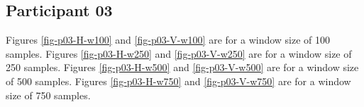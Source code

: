 \documentclass[12pt]{article}
\begin{document}
\newpage
\subsection{Participant 03}
Figures \ref{fig-p03-H-w100} and \ref{fig-p03-V-w100} are for a window size of 100 samples.
Figures \ref{fig-p03-H-w250} and \ref{fig-p03-V-w250} are for a window size of 250 samples.
Figures \ref{fig-p03-H-w500} and \ref{fig-p03-V-w500} are for a window size of 500 samples.
Figures \ref{fig-p03-H-w750} and \ref{fig-p03-V-w750} are for a window size of 750 samples.
\end{document}
